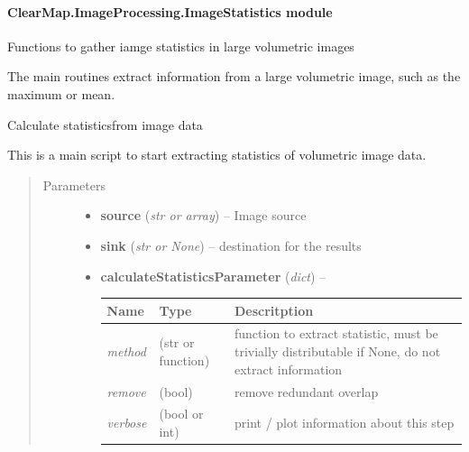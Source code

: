 \documentclass[letterpaper,10pt,english]{sphinxmanual}
\begin{document}
\paragraph{ClearMap.ImageProcessing.ImageStatistics module}
\label{api/ClearMap.ImageProcessing:module-ClearMap.ImageProcessing.ImageStatistics}\label{api/ClearMap.ImageProcessing:clearmap-imageprocessing-imagestatistics-module}
Functions to gather iamge statistics in large volumetric images

The main routines extract information from a large volumetric image, such as
the maximum or mean.

\begin{fulllineitems}
\label{api/ClearMap.ImageProcessing:ClearMap.ImageProcessing.ImageStatistics.calculateStatistics}
Calculate statisticsfrom image data

This is a main script to start extracting statistics of volumetric image data.
\begin{quote}\begin{description}
\item[{Parameters}] \leavevmode\begin{itemize}
\item {} 
\textbf{source} (\emph{str or array}) --
Image source

\item {} 
\textbf{sink} (\emph{str or None}) --
destination for the results

\item {} 
\textbf{calculateStatisticsParameter} (\emph{dict}) --

\begin{tabulary}{\linewidth}{|L|L|L|}
\hline
\textsf{\relax 
Name
} & \textsf{\relax 
Type
} & \textsf{\relax 
Descritption
}\\
\hline
\emph{method}
 & 
(str or function)
 & 
function to extract statistic, must be trivially distributable
if None, do not extract information
\\
\hline
\emph{remove}
 & 
(bool)
 & 
remove redundant overlap
\\
\hline
\emph{verbose}
 & 
(bool or int)
 & 
print / plot information about this step
\\
\hline\end{tabulary}



\end{itemize}
\end{description}
\end{quote}
\end{fulllineitems}
\end{document}
